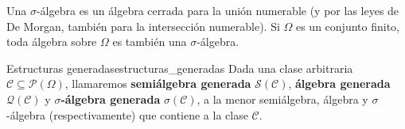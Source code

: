 \begin{observacion}
Una $\sigma$-álgebra es un álgebra cerrada para la unión numerable (y por las leyes de De Morgan, también para la intersección numerable). Si $\Omega$ es un conjunto finito, toda álgebra sobre $\Omega$ es también una $\sigma$-álgebra.
\end{observacion}

\newpage

\begin{definicion}{Estructuras generadas}{estructuras_generadas}
Dada una clase arbitraria $\mathcal{C} \subseteq \mathcal{P}(\Omega)$, llamaremos \textbf{semiálgebra generada} $\mathcal{S}(\mathcal{C})$, \textbf{álgebra generada} $\mathcal{Q}(\mathcal{C})$ y \textbf{$\sigma$-álgebra generada} $\sigma(\mathcal{C})$, a la menor semiálgebra, álgebra y $\sigma$-álgebra (respectivamente) que contiene a la clase $\mathcal{C}$.
\end{definicion}

